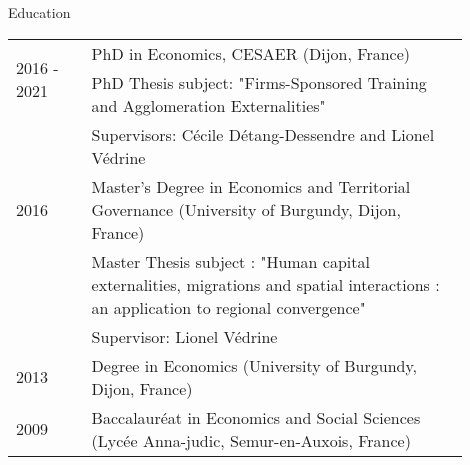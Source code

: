 \documentclass{resume} %
\begin{document}
\newpage
\begin{rSection}{Education}
\begin{table}[H]
{\def\arraystretch{1.5}\tabcolsep=0pt
\begin{tabular}{p{0.15\linewidth}p{0.75\linewidth}}

  \multirow{2}{*}[0.85em]{2016 - 2021} & PhD in Economics, CESAER (Dijon, France) \\
  
  & \footnotesize{PhD Thesis subject: "Firms-Sponsored Training and Agglomeration Externalities"} \\
  & \footnotesize{Supervisors: Cécile Détang-Dessendre and Lionel Védrine} \\
  
  2016 & Master's Degree in Economics and Territorial Governance (University of Burgundy, Dijon, France)\\
  & \footnotesize{Master Thesis subject : "Human capital externalities, migrations and spatial interactions : an application to regional convergence"} \\
  & \footnotesize{Supervisor: Lionel Védrine} \\

  2013 &  Degree in Economics (University of Burgundy, Dijon, France) \\
  
  2009 & Baccalauréat in Economics and Social Sciences (Lycée Anna-judic, Semur-en-Auxois, France)

\end{tabular}%
}
\end{table}
\end{rSection}
\end{document}
